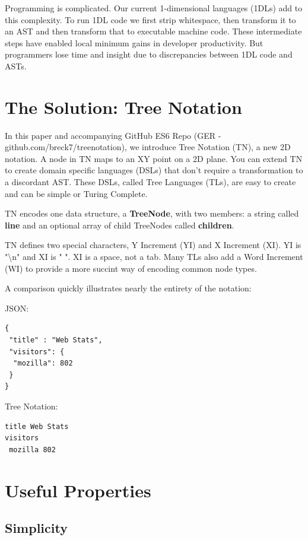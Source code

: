 \documentclass[journal]{IEEEtran}
\begin{document}
Programming is complicated. Our current 1-dimensional languages (1DLs) add to this complexity. To run 1DL code we first strip whitespace, then transform it to an AST and then transform that to executable machine code. These intermediate steps have enabled local minimum gains in developer productivity. But programmers lose time and insight due to discrepancies between 1DL code and ASTs.

\section{The Solution: Tree Notation}

In this paper and accompanying GitHub ES6 Repo (GER - github.com/breck7/treenotation), we introduce Tree Notation (TN), a new 2D notation. A node in TN maps to an XY point on a 2D plane. You can extend TN to create domain specific languages (DSLs) that don't require a transformation to a discordant AST. These DSLs, called Tree Languages (TLs), are easy to create and can be simple or Turing Complete.

TN encodes one data structure, a \textbf{TreeNode}, with two members: a string called \textbf{line} and an optional array of child TreeNodes called \textbf{children}.

TN defines two special characters, Y Increment (YI) and X Increment (XI). YI is "\textbackslash n" and XI is " ".  XI is a space, not a tab. Many TLs also add a Word Increment (WI) to provide a more succint way of encoding common node types.

A comparison quickly illustrates nearly the entirety of the notation:

JSON:

\begin{lstlisting}
{
 "title" : "Web Stats",
 "visitors": {
  "mozilla": 802
 }
}
\end{lstlisting}

Tree Notation:

\begin{lstlisting}
title Web Stats
visitors
 mozilla 802
\end{lstlisting}

\section{Useful Properties}

\subsection{Simplicity}
\end{document}

